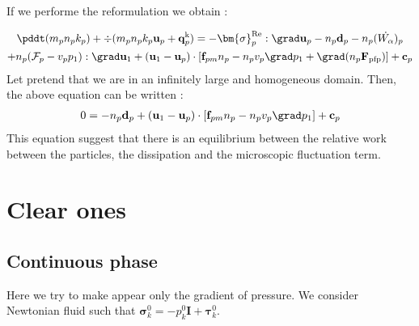 If we performe the reformulation we obtain : 

\begin{multline*}
    \pddt(m_p n_pk_p)
    + \div(m_pn_p k_p \textbf{u}_p 
    + \textbf{q}_p^\text{k})
    = 
     - \bm{\sigma}_p^\text{Re}  :\grad \textbf{u}_p
     - n_p\textbf{d}_p
     - n_p(\dot{W_\alpha})_p\\
     + n_p(\mathcal{F}_p - v_p p_1): \grad \textbf{u}_1+
     (\textbf{u}_1 - \textbf{u}_p) \cdot [\textbf{f}_{pm}n_p - n_pv_p\grad p_1+\grad (n_p \textbf{F}_\text{pfp})] 
     + \textbf{c}_p
    \\
\end{multline*}
Let pretend that we are in an infinitely large and homogeneous domain. 
Then, the above equation can be written :
\begin{multline*}
    0
    = 
     - n_p\textbf{d}_p
     + (\textbf{u}_1 - \textbf{u}_p) \cdot [\textbf{f}_{pm}n_p - n_pv_p\grad p_1] 
     + \textbf{c}_p
    \\
\end{multline*}
This equation suggest that there is an equilibrium between the relative work between the particles, the dissipation and the microscopic fluctuation term. 

\section{Clear ones}
\subsection{Continuous phase}
Here we try to make appear only the gradient of pressure. 
We consider Newtonian fluid such that $\bm{\sigma}_k^0 = -p^0_k \textbf{I} + \bm{\tau}_k^0$. 

